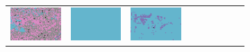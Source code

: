 \documentclass{ipol}
\begin{document}
\begin{figure}[ht]
\begin{subfigure}[t]{\linewidth}
\begin{tabular}{ccccccccc}
                \includegraphics[width=\s]{images/night/DHT/bid_64_grids.png}&
                \includegraphics[width=\s]{images/night/LINEAR/bid_64_grids.png}&
                \includegraphics[width=\s]{images/night/PPG/bid_64_grids.png}&

\end{tabular}
\end{subfigure}
\end{figure}
\end{document}
